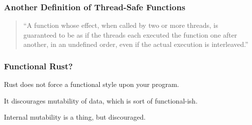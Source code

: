 \begin{frame}
  \frametitle{Another Definition of Thread-Safe Functions}

  

\begin{quote}
  ``A function whose effect, when called by two or more threads, is guaranteed to
  be as if the threads each executed the function one after another, in an
  undefined order, even if the actual execution is interleaved.''
\end{quote}
  
\end{frame}


\begin{frame}
\frametitle{Functional Rust?}

Rust does not force a functional style upon your program.

It discourages mutability of data, which is sort of functional-ish.

Internal mutability is a thing, but discouraged.

\end{frame}






